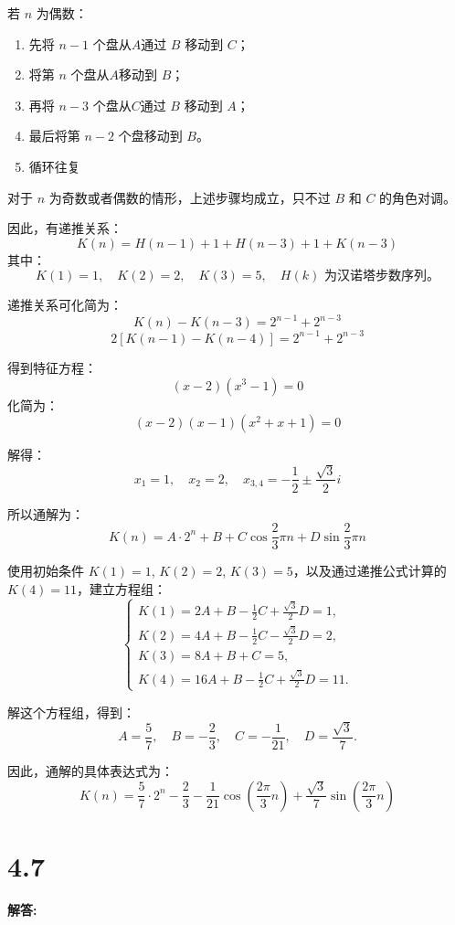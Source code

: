 \documentclass{article}
\begin{document}
若 \(n\) 为偶数：

\begin{enumerate}
    \item 先将 \(n-1\) 个盘从\(A\)通过 \(B\) 移动到 \(C\)；
    \item 将第 \(n\) 个盘从\(A\)移动到 \(B\)；
    \item 再将 \(n-3\) 个盘从\(C\)通过 \(B\) 移动到 \(A\)；
    \item 最后将第 \(n-2\) 个盘移动到 \(B\)。
    \item 循环往复
\end{enumerate}

对于 \(n\) 为奇数或者偶数的情形，上述步骤均成立，只不过 \(B\) 和 \(C\) 的角色对调。

因此，有递推关系：
\[
K(n) = H(n-1) + 1 + H(n-3) + 1 + K(n-3)
\]
其中：
\[
K(1) = 1, \quad K(2) = 2, \quad K(3) = 5, \quad H(k) \text{ 为汉诺塔步数序列。}
\]

递推关系可化简为：
\[
K(n) - K(n-3) = 2^{n-1} + 2^{n-3}
\]
\[
2[K(n-1) - K(n-4)] = 2^{n-1} + 2^{n-3}
\]

得到特征方程：
\[
(x-2)(x^3-1) = 0
\]
化简为：
\[
(x-2)(x-1)(x^2 + x + 1) = 0
\]

解得：
\[
x_1 = 1, \quad x_2 = 2, \quad x_{3,4} = -\frac{1}{2} \pm \frac{\sqrt{3}}{2}i
\]

所以通解为：
\[
K(n) = A \cdot 2^n + B + C \cos \frac{2}{3} \pi n + D \sin \frac{2}{3} \pi n
\]

使用初始条件 \(K(1) = 1\), \(K(2) = 2\), \(K(3) = 5\)，以及通过递推公式计算的 \(K(4) = 11\)，建立方程组：
\[
\begin{cases}
K(1) = 2A + B - \frac{1}{2}C + \frac{\sqrt{3}}{2}D = 1, \\
K(2) = 4A + B - \frac{1}{2}C - \frac{\sqrt{3}}{2}D = 2, \\
K(3) = 8A + B + C = 5, \\
K(4) = 16A + B - \frac{1}{2}C + \frac{\sqrt{3}}{2}D = 11.
\end{cases}
\]

解这个方程组，得到：
\[
A = \frac{5}{7}, \quad B = -\frac{2}{3}, \quad C = -\frac{1}{21}, \quad D = \frac{\sqrt{3}}{7}.
\]

因此，通解的具体表达式为：
\[
\boxed{ K(n) = \frac{5}{7} \cdot 2^n - \frac{2}{3} - \frac{1}{21} \cos \left( \frac{2\pi}{3} n \right) + \frac{\sqrt{3}}{7} \sin \left( \frac{2\pi}{3} n \right)}
\]

\section*{4.7}
\textbf{解答:}
\end{document}
